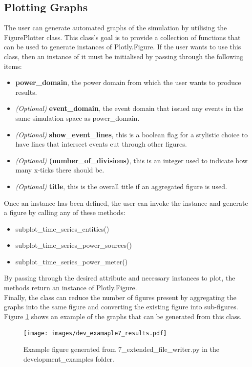 \documentclass{l4proj}
\begin{document}
\subsection{Plotting Graphs}\label{subsec:imp:figureplotter}
The user can generate automated graphs of the simulation by utilising the FigurePlotter class.
This class's goal is to provide a collection of functions that can be used to generate instances of Plotly.Figure.
If the user wants to use this class, then an instance of it must be initialised by passing through the following items:
\begin{itemize}
    \item \textbf{power\_domain}, the power domain from which the user wants to produce results.
    \item \textit{(Optional)} \textbf{event\_domain}, the event domain that issued any events in the same simulation space as power\_domain.
    \item \textit{(Optional)} \textbf{show\_event\_lines}, this is a boolean flag for a stylistic choice to have lines that intersect events cut through other figures.
    \item \textit{(Optional)} \textbf{(number\_of\_divisions)}, this is an integer used to indicate how many x-ticks there should be.
    \item \textit{(Optional)} \textbf{title}, this is the overall title if an aggregated figure is used.
\end{itemize}
Once an instance has been defined, the user can invoke the instance and generate a figure by calling any of these methods:
\begin{itemize}
    \item subplot\_time\_series\_entities()
    \item subplot\_time\_series\_power\_sources()
    \item subplot\_time\_series\_power\_meter()
\end{itemize}
By passing through the desired attribute and necessary instances to plot, the methods return an instance of Plotly.Figure.\\
Finally, the class can reduce the number of figures present by aggregating the graphs into the same figure and converting the existing figure into sub-figures.
Figure \ref{fig:dev-example7-results} shows an example of the graphs that can be generated from this class.
\begin{figure}[h]
    \centering
    \texttt{[image: images/dev\_examaple7\_results.pdf]}
    ~
    \caption{Example figure generated from 7\_extended\_file\_writer.py in the development\_examples folder.}
    \label{fig:dev-example7-results}
\end{figure}
\end{document}
